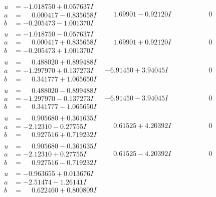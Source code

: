 \documentclass[1p]{elsarticle_modified}
\theoremstyle{definition}
\begin{document}
$$\begin{array}{c|c|c}
\begin{aligned}
u &= -1.018750 + 0.057637 I \\
a &= \phantom{-}0.000417 - 0.835658 I \\
b &= -0.205473 - 1.001370 I\end{aligned}
 & \phantom{-}1.69901 - 0.92120 I & \phantom{-0.000000 } 0 \\ \hline\begin{aligned}
u &= -1.018750 - 0.057637 I \\
a &= \phantom{-}0.000417 + 0.835658 I \\
b &= -0.205473 + 1.001370 I\end{aligned}
 & \phantom{-}1.69901 + 0.92120 I & \phantom{-0.000000 } 0 \\ \hline\begin{aligned}
u &= \phantom{-}0.488020 + 0.899488 I \\
a &= -1.297970 + 0.137273 I \\
b &= \phantom{-}0.341777 + 1.065650 I\end{aligned}
 & -6.91450 + 3.94045 I & \phantom{-0.000000 } 0 \\ \hline\begin{aligned}
u &= \phantom{-}0.488020 - 0.899488 I \\
a &= -1.297970 - 0.137273 I \\
b &= \phantom{-}0.341777 - 1.065650 I\end{aligned}
 & -6.91450 - 3.94045 I & \phantom{-0.000000 } 0 \\ \hline\begin{aligned}
u &= \phantom{-}0.905680 + 0.361635 I \\
a &= -2.12310 - 0.27755 I \\
b &= \phantom{-}0.927516 + 0.719232 I\end{aligned}
 & \phantom{-}0.61525 + 4.20392 I & \phantom{-0.000000 } 0 \\ \hline\begin{aligned}
u &= \phantom{-}0.905680 - 0.361635 I \\
a &= -2.12310 + 0.27755 I \\
b &= \phantom{-}0.927516 - 0.719232 I\end{aligned}
 & \phantom{-}0.61525 - 4.20392 I & \phantom{-0.000000 } 0 \\ \hline\begin{aligned}
u &= -0.963655 + 0.013676 I \\
a &= -2.51474 - 1.26141 I \\
b &= \phantom{-}0.622460 + 0.800809 I\end{aligned}

\end{array}$$
\end{document}

